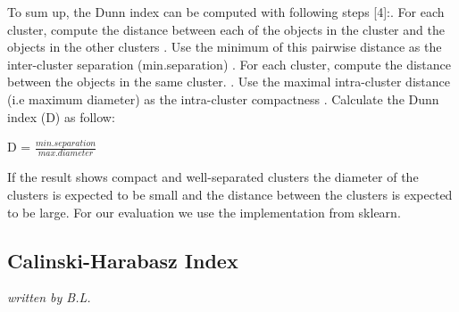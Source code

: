 To sum up, the Dunn index can be computed with following steps [4]:.	For each cluster, compute the distance between each of the objects in the cluster and the objects in the other clusters .	Use the minimum of this pairwise distance as the inter-cluster separation (min.separation) .	For each cluster, compute the distance between the objects in the same cluster. .	Use the maximal intra-cluster distance (i.e maximum diameter) as the intra-cluster compactness .	Calculate the Dunn index (D) as follow: \newline

    D = $\frac{min.separation}{max.diameter}$ \cite{dunn-website-2} \newline

If the result shows compact and well-separated clusters the diameter of the clusters is expected to be small and the distance between the clusters is expected to be large. For our evaluation we use the implementation from \gls{sklearn}.





\subsection{Calinski-Harabasz Index}
\textit{written by B.L.}\\

